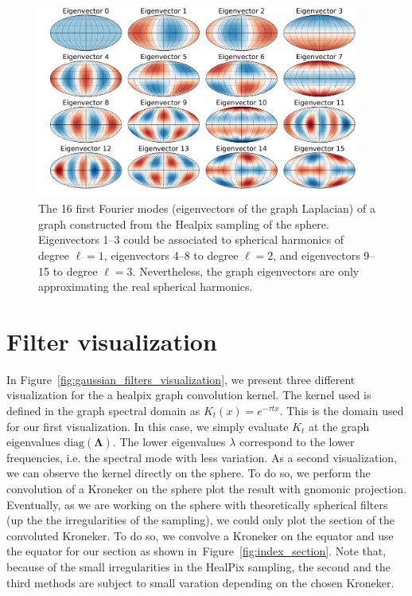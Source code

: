 \documentclass[final,twocolumn,3p,times,authoryear]{elsarticle}
\newcommand{\figref}[1]{Figure~\ref{fig:#1}}
\renewcommand{\b}[1]{{\bm{#1}}}   %
\newcommand{\1}{\b{1}}              %
\newcommand{\0}{\b{0}}              %
\newcommand{\bLambda}{\b{\Lambda}}
\begin{document}
\label{sec:spherical_harmonics}
\begin{figure}[!htb]
\centering
\includegraphics[width=0.95\textwidth]{figures/eigenvectors.pdf}
\caption{The 16 first Fourier modes (eigenvectors of the graph Laplacian) of a graph constructed from the Healpix sampling of the sphere. Eigenvectors 1--3 could be associated to spherical harmonics of degree $\ell=1$, eigenvectors 4--8 to degree $\ell=2$, and eigenvectors 9--15 to degree $\ell=3$. Nevertheless, the graph eigenvectors are only approximating the real spherical harmonics.}
\label{fig:graph_harmonics}
\end{figure}



\section{Filter visualization}
\label{sec:filter_visualization}

In \figref{gaussian_filters_visualization}, we present three different
visualization for the a healpix graph convolution kernel. The kernel used is defined in the graph spectral domain as $K_t(x)=e^{-\tau t x}$. This is the domain used for our first visualization. In this case, we simply evaluate $K_t$
at the graph eigenvalues $\text{diag}(\bLambda)$. The lower eigenvalues $\lambda$ correspond to the lower frequencies, i.e. the spectral mode with less variation. 
As a second visualization, we can observe the kernel directly on the sphere. To do so, we perform the convolution of a
Kroneker on the sphere plot the result with gnomonic projection. Eventually, as we are
working on the sphere with theoretically spherical filters (up the the irregularities of the sampling), we could only plot the section of the convoluted Kroneker. To do so, we convolve a Kroneker on the equator and use the equator for our section as shown in~\figref{index_section}. Note that, because of the small irregularities in the HealPix
sampling, the second and the third methods are subject to small varation depending on the
chosen Kroneker. 
\end{document}
